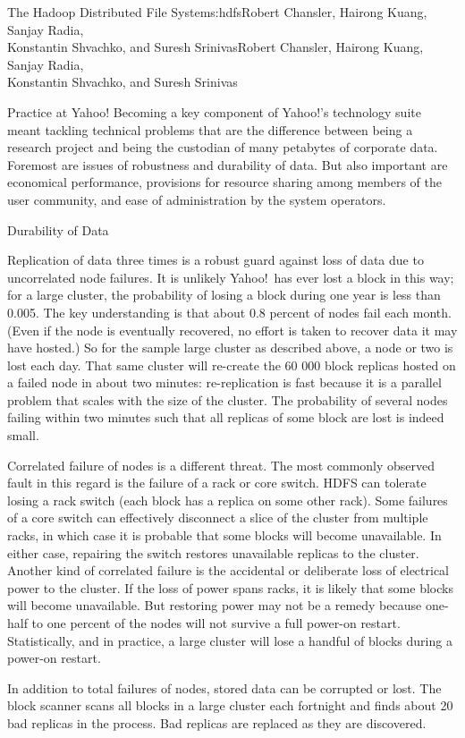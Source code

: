\begin{aosachaptertoc}{The Hadoop Distributed File System}{s:hdfs}{Robert Chansler, Hairong Kuang, Sanjay Radia, \\ Konstantin Shvachko, and Suresh Srinivas}{Robert Chansler, Hairong Kuang, Sanjay Radia, \\ \hspace*{0.9cm} Konstantin Shvachko, and Suresh Srinivas}
\begin{aosasect1}{Practice at Yahoo!}
Becoming a key component of Yahoo!'s technology suite meant tackling
technical problems that are the difference between being a research
project and being the custodian of many petabytes of corporate data.
Foremost are issues of robustness and durability of data. But also
important are economical performance, provisions for resource sharing
among members of the user community, and ease of administration by the
system operators.

\begin{aosasect2}{Durability of Data}

Replication of data three times is a robust guard against loss of data
due to uncorrelated node failures. It is unlikely Yahoo!\ has ever lost
a block in this way; for a large cluster, the probability of losing a
block during one year is less than 0.005. The key understanding is
that about 0.8 percent of nodes fail each month. (Even if the node is
eventually recovered, no effort is taken to recover data it may have
hosted.) So for the sample large cluster as described above, a node or
two is lost each day. That same cluster will re-create the 60 000
block replicas hosted on a failed node in about two
minutes: re-replication is fast because it is a parallel problem that
scales with the size of the cluster. The probability of several nodes
failing within two minutes such that all replicas of some block are
lost is indeed small.

Correlated failure of nodes is a different threat. The most commonly
observed fault in this regard is the failure of a rack or core switch.
HDFS can tolerate losing a rack switch (each block has a replica on
some other rack). Some failures of a core switch can effectively
disconnect a slice of the cluster from multiple racks, in which case
it is probable that some blocks will become unavailable. In either
case, repairing the switch restores unavailable replicas to the
cluster. Another kind of correlated failure is the accidental or
deliberate loss of electrical power to the cluster. If the loss of
power spans racks, it is likely that some blocks will become
unavailable. But restoring power may not be a remedy because one-half
to one percent of the nodes will not survive a full power-on restart.
Statistically, and in practice, a large cluster will lose a handful of
blocks during a power-on restart.

In addition to total failures of nodes, stored data can be corrupted
or lost. The block scanner scans all blocks in a large cluster each
fortnight and finds about 20 bad replicas in the process. Bad replicas
are replaced as they are discovered.


\end{aosasect2}
\end{aosasect1}
\end{aosachaptertoc}
